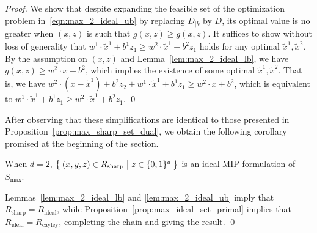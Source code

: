 \documentclass[smallextended]{svjour3}
\newcommand{\tx}{\widetilde{x}}
\newcommand{\Rcayley}{R_{\operatorname{cayley}}}
\newcommand{\Rideal}{R_{\operatorname{ideal}}}
\newcommand{\Rsharp}{R_{\operatorname{sharp}}}
\newcommand{\Smax}{S_{\operatorname{max}}}
\newcommand{\ubar}[1]{\underline{#1}}
\renewcommand{\bar}[1]{\overline{#1}}
\begin{document}
\begin{proof}

We show that despite expanding the feasible set of the optimization problem in~\eqref{eqn:max_2_ideal_ub} by replacing $D_{|k}$ by $D$, its optimal value is no greater when $(x,z)$ is such that $\bar{g}(x,z)\ge\ubar{g}(x,z)$.  It suffices to show without loss of generality that $w^1 \cdot \tx^1 + b^1 z_1 \geq w^2 \cdot \tx^1 + b^2 z_1$ holds for any optimal $\tx^1, \tx^2$. By the assumption on $(x,z)$ and Lemma~\ref{lem:max_2_ideal_lb}, we have $\bar{g}(x,z) \geq w^2 \cdot x + b^2$, which implies the existence of some optimal $\tx^1, \tx^2$. That is, we have $w^2 \cdot (x - \tx^1) + b^2 z_2 + w^1 \cdot \tx^1 + b^1 z_1 \geq w^2 \cdot x + b^2$, which is equivalent to $w^1 \cdot \tx^1 + b^1 z_1 \geq w^2 \cdot \tx^1 + b^2 z_1$.
\qed\end{proof}

After observing that these simplifications are identical to those presented in Proposition~\ref{prop:max_sharp_set_dual}, we obtain the following corollary promised at the beginning of the section.

\begin{corollary} \label{cor:max_2_ideal_general}
    When $d=2$, $\Set{(x,y,z) \in \Rsharp | z \in \{0,1\}^d}$ is an ideal MIP formulation of $\Smax$.
\end{corollary}
\proof{}
Lemmas~\ref{lem:max_2_ideal_lb} and \ref{lem:max_2_ideal_ub} imply that $\Rsharp = \Rideal$, while Proposition~\ref{prop:max_ideal_set_primal} implies that $\Rideal = \Rcayley$, completing the chain and giving the result.
\qed\endproof

\end{document}
